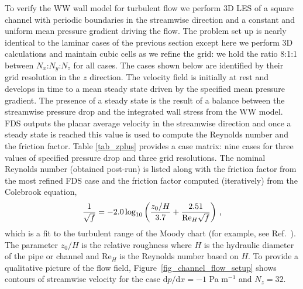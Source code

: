 \documentclass[11pt]{book}
\begin{document}
To verify the WW wall model for turbulent flow we perform 3D LES of a square channel with periodic boundaries in the streamwise direction and a constant and uniform mean pressure gradient driving the flow.  The problem set up is nearly identical to the laminar cases of the previous section except here we perform 3D calculations and maintain cubic cells as we refine the grid: we hold the ratio 8:1:1 between $N_x$:$N_y$:$N_z$ for all cases.  The cases shown below are identified by their grid resolution in the $z$ direction.  The velocity field is initially at rest and develops in time to a mean steady state driven by the specified mean pressure gradient.  The presence of a steady state is the result of a balance between the streamwise pressure drop and the integrated wall stress from the WW model.  FDS outputs the planar average velocity in the streamwise direction and once a steady state is reached this value is used to compute the Reynolds number and the friction factor.  Table \ref{tab_zplus} provides a case matrix: nine cases for three values of specified pressure drop and three grid resolutions.  The nominal Reynolds number (obtained post-run) is listed along with the friction factor from the most refined FDS case and the friction factor computed (iteratively) from the Colebrook equation,
\begin{equation}
\label{eqn_colebrook}
\frac{1}{\sqrt{f}} = -2.0 \log_{\scriptsize 10} \left( \frac{z_0/H}{3.7} + \frac{2.51}{\mbox{Re}_H\sqrt{f}} \right) \,\mbox{,}
\end{equation}
which is a fit to the turbulent range of the Moody chart (for example, see Ref.~\cite{MYO}).  The parameter $z_0/H$ is the relative
roughness where $H$ is the hydraulic diameter of the pipe or channel and Re$_H$ is the Reynolds number based on $H$.
To provide a qualitative picture of the flow field, Figure~\ref{fig_channel_flow_setup} shows contours of streamwise velocity
for the case $\mbox{d}p/\mbox{d}x = -1$ Pa m$^{-1}$ and $N_z=32$.
\end{document}
